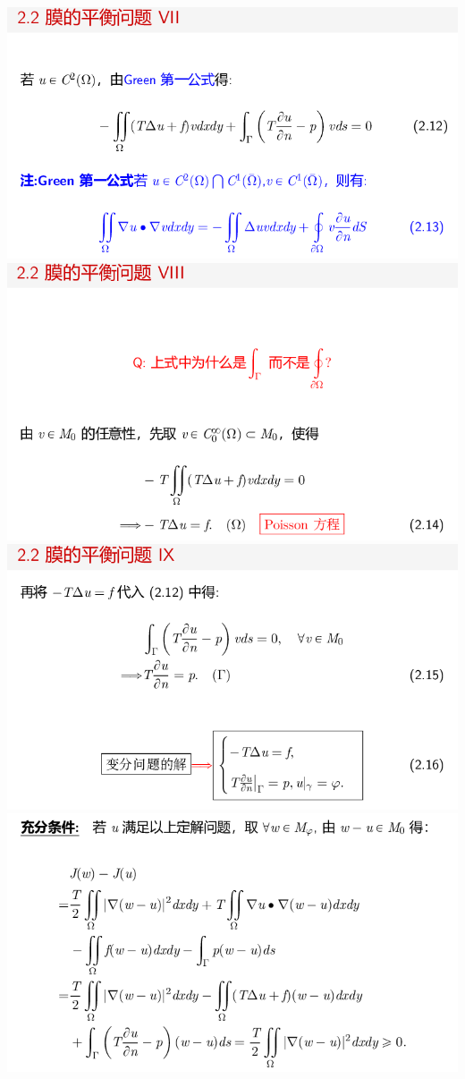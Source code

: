 \documentclass[11pt,a4paper]{ctexart}
\begin{document}
\begin{paracol}{2}
\includegraphics[width=\linewidth]{chap01_64.png}
\includegraphics[width=\linewidth]{chap01_65.png}
\newpage
\includegraphics[width=\linewidth]{chap01_66.png}
\includegraphics[width=\linewidth]{chap01_67.png}

\end{paracol}
\end{document}
